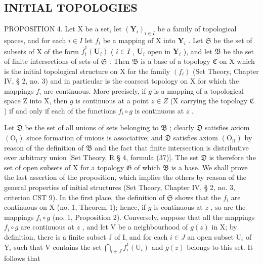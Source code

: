 \subsection{INITIAL TOPOLOGIES}

PROPOSITION 4. Let X be a set, let \((\mathbf{Y}_i)_{i \in I}\) be a family of topological spaces, and for each \(i \in I\) let \(f_i\) be a mapping of X into \(\mathbf{Y}_i\) . Let \(\mathfrak{S}\) be the set of subsets of X of the form \(\overline{f}_i^1 (\mathbf{U}_i)\) ( \(i \in I\) , \(\mathbf{U}_i\) open in \(\mathbf{Y}_i\) ), and let \(\mathfrak{B}\) be the set of finite intersections of sets of \(\mathfrak{S}\) . Then \(\mathfrak{B}\) is a base of a topology \(\mathfrak{C}\) on X which is the initial topological structure on X for the family \((f_i)\) (Set Theory, Chapter IV, § 2, no. 3) and in particular is the coarsest topology on X for which the mappings \(f_i\) are continuous. More precisely, if \(g\) is a mapping of a topological space Z into X, then \(g\) is continuous at a point \(z \in Z\) (X carrying the topology \(\mathfrak{C}\) ) if and only if each of the functions \(f_i \circ g\) is continuous at \(z\) .

Let \(\mathfrak{D}\) be the set of all unions of sets belonging to \(\mathfrak{B}\) ; clearly \(\mathfrak{D}\) satisfies axiom \((\mathrm{O}_{\mathrm{I}})\) since formation of unions is associative; and \(\mathfrak{D}\) satisfies axiom \((\mathrm{O}_{\mathrm{II}})\) by reason of the definition of \(\mathfrak{B}\) and the fact that finite intersection is distributive over arbitrary union {[}Set Theory, R § 4, formula (37){]}. The set \(\mathfrak{D}\) is therefore the set of open subsets of X for a topology \(\mathfrak{G}\) of which \(\mathfrak{B}\) is a base. We shall prove the last assertion of the proposition, which implies the others by reason of the general properties of initial structures (Set Theory, Chapter IV, § 2, no. 3, criterion CST 9). In the first place, the definition of \(\mathfrak{S}\) shows that the \(f_{i}\) are continuous on X (no. 1, Theorem 1); hence, if \(g\) is continuous at \(z\) , so are the mappings \(f_{i} \circ g\) (no. 1, Proposition 2). Conversely, suppose that all the mappings \(f_{i} \circ g\) are continuous at \(z\) , and let V be a neighbourhood of \(g(z)\) in X; by definition, there is a finite subset J of I, and for each \(i \in J\) an open subset \(\mathrm{U}_{i}\) of \(\mathrm{Y}_{i}\) such that V contains the set \(\bigcap_{i \in J} f_{i}^{1}(\mathrm{U}_{i})\) and \(g(z)\) belongs to this set. It follows that

